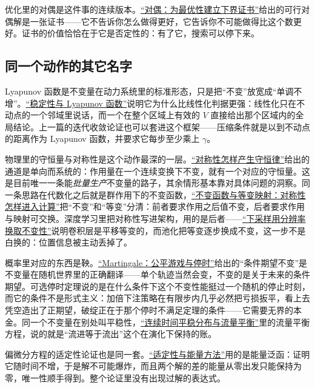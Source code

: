 优化里的对偶是这件事的连续版本。\hyperref[ch:075]{``对偶：为最优性建立下界证书''}给出的可行对偶解是一张证书——它不告诉你怎么做得更好，它告诉你不可能做得比这个数更好。证书的价值恰恰在于它是否定性的：有了它，搜索可以停下来。

\subsection{同一个动作的其它名字}

Lyapunov 函数是不变量在动力系统里的标准形态，只是把``不变''放宽成``单调不增''。\hyperref[sec:15-Differential-Equations-and-Dynamical-Systems/02-Stability-and-Dynamical-Systems/02]{``稳定性与 Lyapunov 函数''}说明它为什么比线性化判据更强：线性化只在不动点的一个邻域里说话，而一个在整个区域上有效的 \(V\) 直接给出那个区域内的全局结论。上一篇的迭代收敛论证也可以套进这个框架——压缩条件就是以到不动点的距离作为 Lyapunov 函数，并要求它每步至少乘上 \(\gamma\)。

物理里的守恒量与对称性是这个动作最深的一层。\hyperref[sec:12-Real-Analysis-Support/10-Essential-Structures/01]{``对称性怎样产生守恒律''}给出的通道是单向而系统的：作用量在一个连续变换下不变，就有一个对应的守恒量。这是目前唯一一条能\emph{批量生产}不变量的路子，其余情形基本靠对具体问题的洞察。同一条思路在代数化之后就是群作用下的不变函数，\hyperref[sec:04-Discrete-Mathematics/06-Groups-and-Symmetry/04]{``不变函数与等变映射：对称性怎样进入计算''}把``不变''和``等变''分清：前者要求作用之后值不变，后者要求作用与映射可交换。深度学习里把对称性写进架构，用的是后者——\hyperref[sec:14-Deep-Learning/04-Convolutional-Networks/03]{``下采样用分辨率换取不变性''}说明卷积层是平移等变的，而池化把等变逐步换成不变，这一步不是白换的：位置信息被主动丢掉了。

概率里对应的东西是鞅。\hyperref[sec:06-Random-Processes/04-Applications/02]{``Martingale：公平游戏与停时''}给出的``条件期望不变''是不变量在随机世界里的正确翻译——单个轨迹当然会变，不变的是关于未来的条件期望。可选停时定理说的是在什么条件下这个不变性能挺过一个随机的停止时刻，而它的条件不是形式主义：加倍下注策略在有限步内几乎必然把亏损扳平，看上去凭空造出了正期望，破绽正在于那个停时不满足定理的条件——它需要无界的本金。同一个不变量在别处叫平稳性，\hyperref[sec:06-Random-Processes/05-Continuous-Time-Markov-Chains-and-Queues/03]{``连续时间平稳分布与流量平衡''}里的流量平衡方程，说的就是``流进等于流出''这个在演化下保持的账。

偏微分方程的适定性论证也是同一套。\hyperref[sec:15-Differential-Equations-and-Dynamical-Systems/03-PDE-Introduction/03]{``适定性与能量方法''}用的是能量泛函：证明它随时间不增，于是解不可能爆炸，而且两个解的差的能量从零出发只能保持为零，唯一性顺手得到。整个论证里没有出现过解的表达式。

